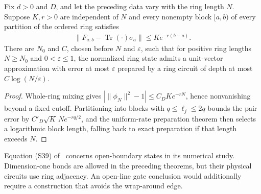 \begin{lemma}
    \label{thm:ldp_rectangular_preparation}
    \leanok
    Fix $d>0$ and $D$, and let the preceding data vary with the ring length
    $N$. Suppose $K,r>0$ are independent of $N$ and every nonempty
    block $[a,b)$ of every partition of the ordered ring satisfies
    \begin{align}
        \|F_{a:b}-\operatorname{Tr}(\cdot)\sigma_a\|
        \le K e^{-r(b-a)}.
    \end{align}
    There are $N_0$ and $C$, chosen before $N$ and $\varepsilon$, such
    that for positive ring lengths $N\ge N_0$ and $0<\varepsilon\le1$, the normalized ring
    state admits a unit-vector approximation with error at most
    $\varepsilon$ prepared by a ring circuit of depth at most
    $C\log(N/\varepsilon)$.
\end{lemma}
\begin{proof}\leanok
    Whole-ring mixing gives
    $|\|\phi_N\|^2-1|\le C_DKe^{-rN}$, hence nonvanishing beyond
    a fixed cutoff. Partitioning into blocks with
    $q\le\ell_j\le2q$ bounds the pair error by
    $C'_D\sqrt K\,N e^{-rq/2}$, and the uniform-rate preparation theorem
    then selects a logarithmic block length, falling back to exact
    preparation if that length exceeds $N$.
\end{proof}

Equation (S39) of~\cite{Malz2024Preparation} concerns open-boundary
states in its numerical study. Dimension-one bonds are allowed in the
preceding theorems, but their physical circuits use ring adjacency.
An open-line gate conclusion would additionally require a construction
that avoids the wrap-around edge.
